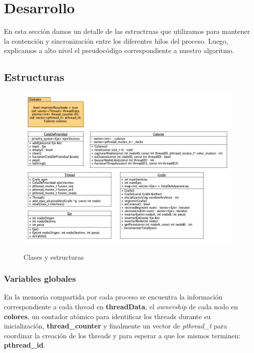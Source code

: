 \section{Desarrollo}

En esta sección damos un detalle de las estructruas que utilizamos para mantener la contención y sincronización entre los diferentes hilos del proceso. Luego, explicamos a alto nivel el pseudocódigo correspondiente a nuestro algoritmo.

\subsection{Estructuras}

\begin{figure}[h]
    \centering
    \includegraphics[width=1\textwidth]{imagenes/tp1.png} \\%
    \caption{Clases y estructuras}
    \label{fig:uml}
\end{figure}

\subsubsection{Variables globales}

En la memoria compartida por cada proceso se encuentra la información correspondiente a cada thread en \textbf{threadData}, el \textit{ownership} de cada nodo en \textbf{colores}, un contador atómico para identificar los threads durante su inicialización, \textbf{thread_counter} y finalmente un vector de \textit{pthread_t} para coordinar la creación de los threads y para esperar a que los mismos terminen: \textbf{pthread_id}.

